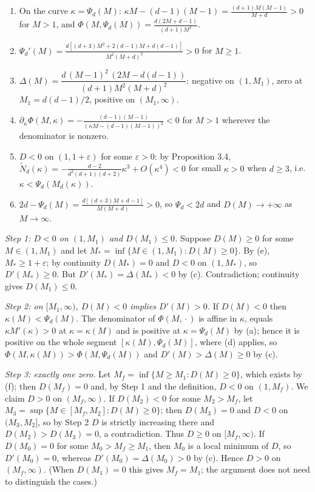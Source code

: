 \documentclass[
  11pt,
  a4paper,
]{article}
\begin{document}
\begin{enumerate}
\def\labelenumi{(\alph{enumi})}
\item
  On the curve \(\kappa=\Psi_d(M)\):
  \(\kappa M-(d-1)(M-1)=\frac{(d+1)M(M-1)}{M+d}>0\) for \(M>1\), and
  \(\Phi(M,\allowbreak{}\Psi_d(M))=\frac{d(2M+d-1)}{(d+1)M^2}\).
\item
  \(\Psi_d'(M)=\frac{d[(d+3)M^2+2(d-1)M+d(d-1)]}{M^2(M+d)^2}>0\) for
  \(M\ge1\).
\item
  \(\Delta(M)=\dfrac{d\,\allowbreak{}(M-1)^2\,\allowbreak{}(2M-d(d-1))}{(d+1)M^2(M+d)^2}\):
  negative on \((1,\allowbreak{}M_1)\), zero at \(M_1=d(d-1)/2\), positive on
  \((M_1,\allowbreak{}\infty)\).
\item
  \(\partial_\kappa\Phi(M,\allowbreak{}\kappa)=-\frac{(d-1)(M-1)}{(\kappa M-(d-1)(M-1))^2}<0\)
  for \(M>1\) wherever the denominator is nonzero.
\item
  \(D<0\) on \((1,\allowbreak{}1+\varepsilon)\) for some \(\varepsilon>0\): by
  Proposition 3.4,
  \(\tilde N_d(\kappa)=-\frac{d-2}{d^2(d+1)(d+2)}\kappa^3+O(\kappa^4)<0\)
  for small \(\kappa>0\) when \(d\ge3\),
  i.e.~\(\kappa<\Psi_d(M_d(\kappa))\).
\item
  \(2d-\Psi_d(M)=\frac{d[(d+3)M+d-1]}{M(M+d)}>0\), so \(\Psi_d<2d\) and
  \(D(M)\to+\infty\) as \(M\to\infty\).
\end{enumerate}

\emph{Step 1: \(D<0\) on \((1,\allowbreak{}M_1)\) and \(D(M_1)\le0\).} Suppose
\(D(M)\ge0\) for some \(M\in(1,\allowbreak{}M_1)\) and let
\(M_*=\inf\{M\in(1,\allowbreak{}M_1):D(M)\ge0\}\). By (e), \(M_*\ge1+\varepsilon\);
by continuity \(D(M_*)=0\) and \(D<0\) on \((1,\allowbreak{}M_*)\), so
\(D'(M_*)\ge0\). But \(D'(M_*)=\Delta(M_*)<0\) by (c). Contradiction;
continuity gives \(D(M_1)\le0\).

\emph{Step 2: on \([M_1,\allowbreak{}\infty)\), \(D(M)<0\) implies \(D'(M)>0\).} If
\(D(M)<0\) then \(\kappa(M)<\Psi_d(M)\). The denominator of
\(\Phi(M,\allowbreak{}\cdot)\) is affine in \(\kappa\), equals
\(\kappa M'(\kappa)>0\) at \(\kappa=\kappa(M)\) and is positive at
\(\kappa=\Psi_d(M)\) by (a); hence it is positive on the whole segment
\([\kappa(M),\allowbreak{}\Psi_d(M)]\), where (d) applies, so
\(\Phi(M,\allowbreak{}\kappa(M))>\Phi(M,\allowbreak{}\Psi_d(M))\) and \(D'(M)>\Delta(M)\ge0\) by
(c).

\emph{Step 3: exactly one zero.} Let \(M_f=\inf\{M\ge M_1:D(M)\ge0\}\),
which exists by (f); then \(D(M_f)=0\) and, by Step 1 and the
definition, \(D<0\) on \((1,\allowbreak{}M_f)\). We claim \(D>0\) on
\((M_f,\allowbreak{}\infty)\). If \(D(M_2)<0\) for some \(M_2>M_f\), let
\(M_3=\sup\{M\in[M_f,\allowbreak{}M_2]:D(M)\ge0\}\); then \(D(M_3)=0\) and \(D<0\) on
\((M_3,\allowbreak{}M_2]\), so by Step 2 \(D\) is strictly increasing there and
\(D(M_2)>D(M_3)=0\), a contradiction. Thus \(D\ge0\) on
\([M_f,\allowbreak{}\infty)\). If \(D(M_0)=0\) for some \(M_0>M_f\ge M_1\), then
\(M_0\) is a local minimum of \(D\), so \(D'(M_0)=0\), whereas
\(D'(M_0)=\Delta(M_0)>0\) by (c). Hence \(D>0\) on \((M_f,\allowbreak{}\infty)\).
(When \(D(M_1)=0\) this gives \(M_f=M_1\); the argument does not need to
distinguish the cases.)
\end{document}
